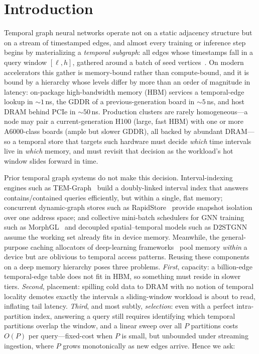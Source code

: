 \documentclass[10pt]{article}
\theoremstyle{definition}
\begin{document}
\section{Introduction}
\label{sec:introduction}

Temporal graph neural networks operate not on a static adjacency structure but on
a stream of timestamped edges, and almost every training or inference step begins
by materializing a \emph{temporal subgraph}: all edges whose timestamps fall in a
query window $[\ell, h]$, gathered around a batch of seed
vertices~\citep{rossi2020tgn,hamilton2017graphsage}. On modern accelerators this
gather is memory-bound rather than compute-bound, and it is bound by a hierarchy
whose levels differ by more than an order of magnitude in latency: on-package
high-bandwidth memory (HBM) services a temporal-edge lookup in ${\sim}1$\,ns,
the GDDR of a previous-generation board in ${\sim}5$\,ns, and host DRAM behind
PCIe in ${\sim}50$\,ns. Production clusters are rarely homogeneous---a node may
pair a current-generation H100 (large, fast HBM) with one or more A6000-class
boards (ample but slower GDDR), all backed by abundant DRAM---so a temporal store
that targets such hardware must decide \emph{which} time intervals live in
\emph{which} memory, and must revisit that decision as the workload's hot window
slides forward in time.

Prior temporal graph systems do not make this decision. Interval-indexing engines
such as TEM-Graph~\citep{temgraph} build a doubly-linked interval index that
answers contains/contained queries efficiently, but within a single, flat memory;
concurrent dynamic-graph stores such as RapidStore~\citep{rapidstore} provide
snapshot isolation over one address space; and collective mini-batch schedulers
for GNN training such as MorphGL~\citep{morphgl} and decoupled spatial--temporal
models such as D2STGNN~\citep{d2stgnn} assume the working set already fits in
device memory. Meanwhile, the general-purpose caching allocators of deep-learning
frameworks~\citep{paszke2019pytorch,nccl} pool memory \emph{within} a device but
are oblivious to temporal access patterns. Reusing these components on a deep
memory hierarchy poses three problems. \emph{First}, capacity: a billion-edge
temporal-edge table does not fit in HBM, so something must reside in slower tiers.
\emph{Second}, placement: spilling cold data to DRAM with no notion of temporal
locality demotes exactly the intervals a sliding-window workload is about to read,
inflating tail latency. \emph{Third}, and most subtly, \emph{selection}: even with
a perfect intra-partition index, answering a query still requires identifying
which temporal partitions overlap the window, and a linear sweep over all $P$
partitions costs $O(P)$ per query---fixed-cost when $P$ is small, but unbounded
under streaming ingestion, where $P$ grows monotonically as new edges arrive.
Hence we ask:
\end{document}
